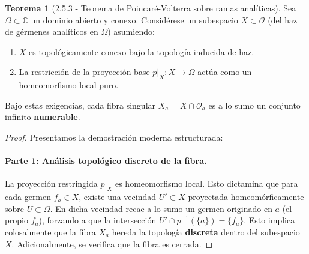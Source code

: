 \documentclass[11pt,a4paper]{article}
\theoremstyle{definition}
\newtheorem{teorema}{Teorema}[section]
\theoremstyle{remark}
\numberwithin{equation}{section}
\begin{document}
\begin{teorema}[2.5.3 - Teorema de Poincaré-Volterra sobre ramas analíticas]
Sea $\Omega \subset \mathbb{C}$ un dominio abierto y conexo. Considérese un subespacio $X \subset \mathcal{O}$ (del haz de gérmenes analíticos en $\Omega$) asumiendo:
\begin{enumerate}
    \item $X$ es topológicamente conexo bajo la topología inducida de haz.
    \item La restricción de la proyección base $p|_X : X \to \Omega$ actúa como un homeomorfismo local puro.
\end{enumerate}
Bajo estas exigencias, cada fibra singular $X_a = X \cap \mathcal{O}_a$ es a lo sumo un conjunto infinito \textbf{numerable}.
\end{teorema}
\begin{proof}
Presentamos la demostración moderna estructurada:
\paragraph{Parte 1: Análisis topológico discreto de la fibra.} La proyección restringida $p|_X$ es homeomorfismo local. Esto dictamina que para cada germen $f_a \in X$, existe una vecindad $U' \subset X$ proyectada homeomórficamente sobre $U \subset \Omega$. En dicha vecindad recae a lo sumo un germen originado en $a$ (el propio $f_a$), forzando a que la intersección $U' \cap p^{-1}(\{a\}) = \{f_a\}$. 
Esto implica colosalmente que la fibra $X_a$ hereda la topología \textbf{discreta} dentro del subespacio $X$. Adicionalmente, se verifica que la fibra es cerrada.


\end{proof}
\end{document}

